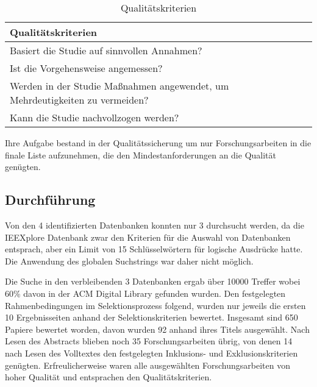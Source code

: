 \begin{table}[!ht]
\renewcommand{\arraystretch}{1.3}
\centering
\begin{threeparttable}
\begin{tabularx}{\columnwidth}{@{}XX@{}}
\toprule
Qualitätskriterien \\ \midrule
Basiert die Studie auf sinnvollen Annahmen? \\
Ist die Vorgehensweise angemessen? \\
Werden in der Studie Maßnahmen angewendet, um Mehrdeutigkeiten zu vermeiden? \\
Kann die Studie nachvollzogen werden? \\
\bottomrule
\end{tabularx}
\medskip
\end{threeparttable}
\caption{Qualitätskriterien}
\label{tab:qualitaetskriterien_review}
\end{table}

Ihre Aufgabe bestand in der Qualitätssicherung um nur Forschungsarbeiten in die finale Liste aufzunehmen, die den Mindestanforderungen an die Qualität genügten.

\subsection{Durchführung}

Von den 4 identifizierten Datenbanken konnten nur 3 durchsucht werden, da die IEEXplore Datenbank zwar den Kriterien für die Auswahl von Datenbanken entsprach, aber ein Limit von 15 Schlüsselwörtern für logische Ausdrücke hatte. Die Anwendung des globalen Suchstrings war daher nicht möglich. 

Die Suche in den verbleibenden 3 Datenbanken ergab über 10000 Treffer wobei 60\% davon in der ACM Digital Library gefunden wurden. Den festgelegten Rahmenbedingungen im Selektionsprozess folgend, wurden nur jeweils die ersten 10 Ergebnisseiten anhand der Selektionskriterien bewertet. Insgesamt sind 650 Papiere bewertet worden, davon wurden 92 anhand ihres Titels ausgewählt. Nach Lesen des Abstracts blieben noch 35 Forschungsarbeiten übrig, von denen 14 nach Lesen des Volltextes den festgelegten Inklusions- und Exklusionskriterien genügten. Erfreulicherweise waren alle ausgewählten Forschungsarbeiten von hoher Qualität und entsprachen den Qualitätskriterien.

